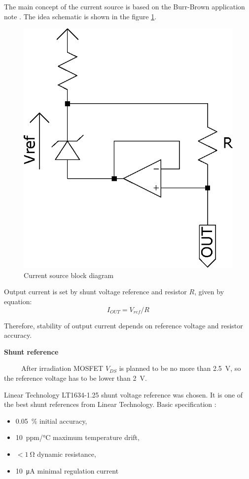         The main concept of the current source is based on the Burr-Brown application note \cite{Make_a_precision_current_source_or_sink}. The idea schematic is shown in the figure \ref{current_source_schematic}.

        \begin{figure}[H]
            \centering
            \includegraphics[width=0.25\paperwidth]{img/06/current_source_schematic.eps}
            \caption{Current source block diagram}
            \label{current_source_schematic}
        \end{figure}

        Output current is set by shunt voltage reference and resistor $R$, given by equation:
        $$I_{OUT} = V_{ref}/R$$

        Therefore, stability of output current depends on reference voltage and resistor accuracy.

        \bigskip \textbf{Shunt reference}

        After irradiation MOSFET $V_{DS}$ is planned to be no more than \SI{2.5}{\volt}, so the reference voltage has to be lower than \SI{2}{\volt}.

        Linear Technology LT1634-1.25 shunt voltage reference was chosen. It is one of the best shunt references from Linear Technology. Basic specification \cite{LT1634_datasheet}:
        \begin{itemize}
            \item \SI{0.05}{\percent} initial accuracy,
            \item \SI{10}{ppm/\degreeCelsius} maximum temperature drift,
            \item $< \SI{1}{\ohm}$ dynamic resistance,
            \item \SI{10}{\uA} minimal regulation current
        \end{itemize}

